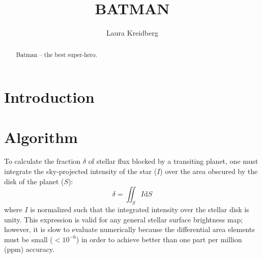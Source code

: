 \documentclass[12pt,preprint]{aastex}
\begin{document}
\title{BATMAN}

\author{Laura Kreidberg}



\begin{abstract}
Batman -- the best super-hero.
\end{abstract}



\section{Introduction}


\section{Algorithm}
\label{section:algorithm}
To calculate the fraction $\delta$ of stellar flux blocked by a transiting planet, one must integrate the sky-projected intensity of the star ($I$) over the area obscured by the disk of the planet ($S$):
\begin{equation}
\delta = \iint_S{I \mathrm{d}S}
\label{eqn:surfaceint}
\end{equation}
where $I$ is normalized such that the integrated intensity over the stellar disk is unity. This expression is valid for any general stellar surface brightness map; however, it is slow to evaluate numerically because the differential area elements must be small ($<10^{-6}$) in order to achieve better than one part per million (ppm) accuracy.
\end{document}
